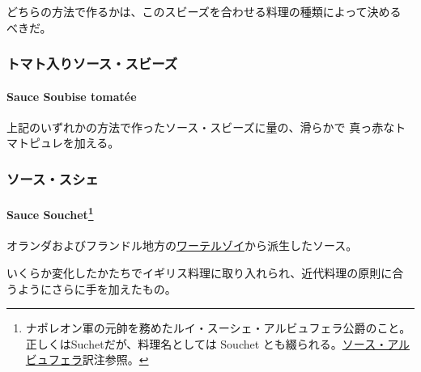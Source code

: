 \begin{recette}
どちらの方法で作るかは、このスビーズを合わせる料理の種類によって決める
べきだ。

\maeaki

\hypertarget{ux30c8ux30deux30c8ux5165ux308aux30bdux30fcux30b9ux30b9ux30d3ux30fcux30ba}{%
\subsubsection{トマト入りソース・スビーズ}\label{ux30c8ux30deux30c8ux5165ux308aux30bdux30fcux30b9ux30b9ux30d3ux30fcux30ba}}

\hypertarget{sauce-soubise-tomatuxe9e}{%
\paragraph{Sauce Soubise tomatée}\label{sauce-soubise-tomatuxe9e}}


上記のいずれかの方法で作ったソース・スビーズに\untiers{}量の、滑らかで
真っ赤なトマトピュレを加える。

\maeaki

\hypertarget{ux30bdux30fcux30b9ux30b9ux30b7ux30a7}{%
\subsubsection{ソース・スシェ}\label{ux30bdux30fcux30b9ux30b9ux30b7ux30a7}}

\hypertarget{sauce-souchet139}{%
\paragraph[Sauce Souchet]{\texorpdfstring{Sauce Souchet\footnote{ナポレオン軍の元帥を務めたルイ・スーシェ・アルビュフェラ公爵のこと。
  正しくはSuchetだが、料理名としては Souchet
  とも綴られる。\protect\hyperlink{sauce-albufera}{ソース・アルビュフェラ}訳注参照。}}{Sauce Souchet}}\label{sauce-souchet139}}


オランダおよびフランドル地方の\protect\hyperlink{}{ワーテルゾイ}から派生したソース。

いくらか変化したかたちでイギリス料理に取り入れられ、近代料理の原則に合
うようにさらに手を加えたもの。


\end{recette}
